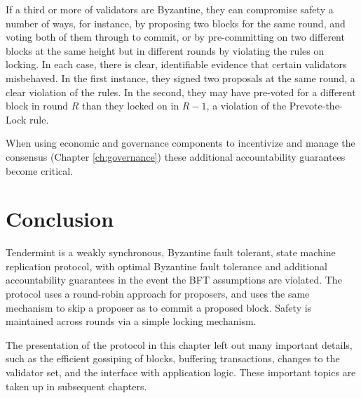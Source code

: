 If a third or more of validators are Byzantine, they can compromise safety a number of ways, 
for instance, by proposing two blocks for the same round, and voting both of them through to commit, 
or by pre-committing on two different blocks at the same height but in 
different rounds by violating the rules on locking.
In each case, there is clear, identifiable evidence that certain validators misbehaved. 
In the first instance, they signed two proposals at the same round, a clear violation of the rules.
In the second, they may have pre-voted for a different block in round $R$ than they locked on in $R-1$, 
a violation of the Prevote-the-Lock rule.

When using economic and governance components to incentivize 
and manage the consensus (Chapter  \ref{ch:governance})
these additional accountability guarantees become critical.

\section{Conclusion}

Tendermint is a weakly synchronous, Byzantine fault tolerant, state machine replication protocol,
with optimal Byzantine fault tolerance and additional accountability guarantees in the event
the BFT assumptions are violated. 
The protocol uses a round-robin approach for proposers, and uses the same mechanism to skip a proposer as to commit a proposed block.
Safety is maintained across rounds via a simple locking mechanism.

The presentation of the protocol in this chapter left out many important details, 
such as the efficient gossiping of blocks, buffering transactions, changes to the validator set, 
and the interface with application logic. These important topics are taken up in subsequent chapters.


